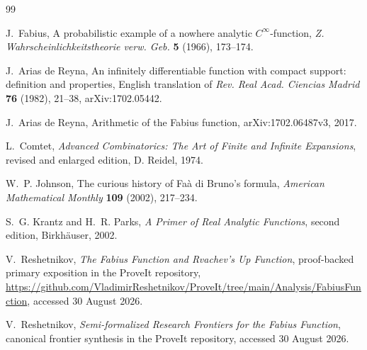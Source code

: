\documentclass[11pt,oneside]{article}
\theoremstyle{definition}
\theoremstyle{remark}
\begin{document}
\small
\begin{thebibliography}{99}

J.~Fabius,
\newblock A probabilistic example of a nowhere analytic $C^\infty$-function,
\newblock \emph{Z. Wahrscheinlichkeitstheorie verw. Geb.} \textbf{5} (1966),
173--174.

J.~Arias de Reyna,
\newblock An infinitely differentiable function with compact support: definition and
properties,
\newblock English translation of \emph{Rev. Real Acad. Ciencias Madrid} \textbf{76}
(1982), 21--38, arXiv:1702.05442.

J.~Arias de Reyna,
\newblock Arithmetic of the Fabius function,
\newblock arXiv:1702.06487v3, 2017.

L.~Comtet,
\newblock \emph{Advanced Combinatorics: The Art of Finite and Infinite Expansions},
\newblock revised and enlarged edition, D. Reidel, 1974.

W.~P. Johnson,
\newblock The curious history of Fa\`a di Bruno's formula,
\newblock \emph{American Mathematical Monthly} \textbf{109} (2002), 217--234.

S.~G. Krantz and H.~R. Parks,
\newblock \emph{A Primer of Real Analytic Functions},
\newblock second edition, Birkh\"auser, 2002.

V.~Reshetnikov,
\newblock \emph{The Fabius Function and Rvachev's Up Function},
\newblock proof-backed primary exposition in the ProveIt repository,
\newblock \url{https://github.com/VladimirReshetnikov/ProveIt/tree/main/Analysis/FabiusFunction},
accessed 30 August 2026.

V.~Reshetnikov,
\newblock \emph{Semi-formalized Research Frontiers for the Fabius Function},
\newblock canonical frontier synthesis in the ProveIt repository, accessed
30 August 2026.

\end{thebibliography}
\end{document}
